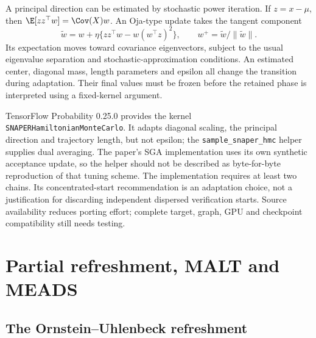 A principal direction can be estimated by stochastic power iteration. If
$z=x-\mu$, then $\E[zz^\top w]=\Cov(X)w$. An Oja-type update takes the
tangent component
\begin{equation}
 \widetilde w=w+\eta\{zz^\top w-w(w^\top z)^2\},\qquad
 w^+=\widetilde w/\|\widetilde w\|.
 \label{eq:bf-modern-oja}
\end{equation}
Its expectation moves toward covariance eigenvectors, subject to the usual
eigenvalue separation and stochastic-approximation conditions. An estimated
center, diagonal mass, length parameters and epsilon all change the
transition during adaptation. Their final values must be frozen before the
retained phase is interpreted using a fixed-kernel argument.

TensorFlow Probability 0.25.0 provides the kernel
\texttt{SNAPER\allowbreak Hamiltonian\allowbreak MonteCarlo}.
It adapts diagonal scaling,
the principal direction and trajectory length, but not epsilon; the
\texttt{sample\_snaper\_hmc} helper supplies dual averaging. The paper's
SGA implementation uses its own synthetic acceptance update, so the helper
should not be described as byte-for-byte reproduction of that tuning scheme.
The implementation requires at least two chains. Its concentrated-start
recommendation is an adaptation choice, not a justification for discarding
independent dispersed verification starts. Source availability reduces porting
effort; complete target, graph, GPU and checkpoint compatibility still needs
testing.

\section{Partial refreshment, MALT and MEADS}
\label{sec:bf-modern-persistence}

\subsection{The Ornstein--Uhlenbeck refreshment}

